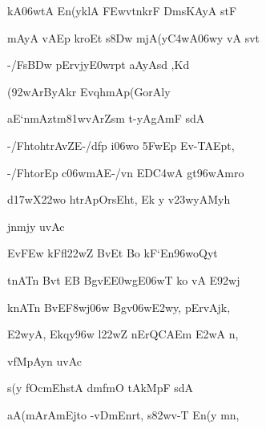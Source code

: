 \dnnemslokac 
{\dn kA\306wtA En(yklA \3FEwvt\0nkrF Dm\0sKAyA stF}
\dontdisplaylinenum

\dnnemslokad 
{\dn mAyA vAEp kroEt s\38Dw mjA(y\3C4wA\306wy vA s\?vt\? \vegdn\dontdisplaylinenum}


\ujvers\dnnemsloka 
{\dn -/Fs\3BDw\2 pErvj\0y\?\3E0wrpt\? aAyAsd\2 ,Kd}
\dontdisplaylinenum

\dnnemslokab 
{\dn {}(\392wArByAkr\2 EvqhmAp(GorAly \dandadn\dontdisplaylinenum}

\dnnemslokac 
{\dn aE`nmA\0ztm\381wvArZsm t-yAgAmF sdA}
\dontdisplaylinenum

\dnnemslokad 
{\dn -/Fh\?toh\0trAvZE-/dfp i\306wo \35FwEp Ev-TAEpt, \vegdn\dontdisplaylinenum}


\ujvers\dnnemsloka 
{\dn -/Fh\?torEp c\306wmAE-/vn\? ED\3C4wA\2 gt\396wAmro}
\dontdisplaylinenum

\dnnemslokad 
{\dn d\317wX\322wo htrApOrsEht, Ek\2 y v\323wyAMyh \vegdn\dontdisplaylinenum}




\dnvers

{\dn jnm\?jy uvAc{\dandabdn}\dontdisplaylinenum }

\nemsloka

\dnnemsloka 
{\dn Ev\3FEw\? kFfl\322wZ\2 BvEt Bo kF`En\396woQyt\?}
\dontdisplaylinenum

\dnnemslokab 
{\dn t\?nAT\?{\qvb}n Bv\?t EB BgvE\3E0wg\5E\306wT ko vA E\392wj \dandadn\dontdisplaylinenum}

\dnnemslokac 
{\dn k\?nAT\?{\qvb}n Bv\?E\3F8wj\?\306w Bgv\306w\3E2w\?y, pErv\5Ajk,}
\dontdisplaylinenum

\dnnemslokad 
{\dn {\rs !\re} \3E2w\?yA, Ekqy\396w l\322wZ n\?ErQCAEm \3E2wA\2 n, \vegdn\dontdisplaylinenum}


\dnvers

{\dn v\4fMpAyn uvAc{\dandabdn}\dontdisplaylinenum }

\nemsloka

\dnnemsloka 
{\dn s(y\2 fOcmEh\2stA dmfmO tAkMpF sdA}
\dontdisplaylinenum

\dnnemslokab 
{\dn aA(mArAmEjto -vDm\0Enrt, s\382wv-T En(y\2 mn, \dandadn\dontdisplaylinenum}

